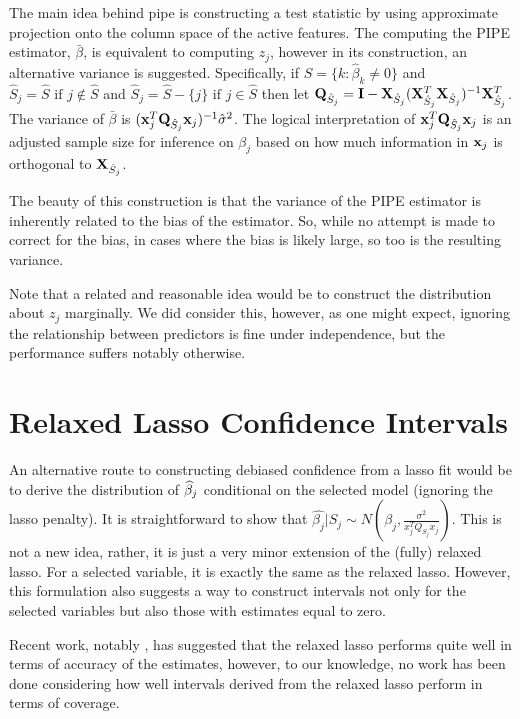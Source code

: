 The main idea behind pipe is constructing a test statistic by using approximate projection onto the column space of the active features. The computing the PIPE estimator, $\bar{\beta}$, is equivalent to computing $z_j$, however in its construction, an alternative variance is suggested. Specifically, if $\hat{S} = \lbrace k: \hat{\beta}_k \neq  0 \rbrace$ and $\hat{S}_j = \hat{S} \text{ if } j \notin \hat{S}$ and $\hat{S}_j = \hat{S} - \lbrace j \rbrace \text{ if } j \in \hat{S}$  then let $\mathbf{Q}_{\hat{S}_j} = \mathbf{I} - \mathbf{X}_{\hat{S}_j}(\mathbf{X}_{\hat{S}_j}^T \mathbf{X}_{\hat{S}_j})^{-1} \mathbf{X}_{\hat{S}_j}^T$. The variance of $\bar{\beta}$ is $(\mathbf{x}_j^T \mathbf{Q}_{\hat{S}_j} \mathbf{x}_j)^{-1}\hat{\sigma}^2$. The logical interpretation of $\mathbf{x}_j^T \mathbf{Q}_{\hat{S}_j} \mathbf{x}_j$ is an adjusted sample size for inference on $\beta_j$ based on how much information in $\mathbf{x}_j$ is orthogonal to $\mathbf{X}_{\hat{S}_j}$. 

The beauty of this construction is that the variance of the PIPE estimator is inherently related to the bias of the estimator. So, while no attempt is made to correct for the bias, in cases where the bias is likely large, so too is the resulting variance.

Note that a related and reasonable idea would be to construct the distribution about $z_j$ marginally. We did consider this, however, as one might expect, ignoring the relationship between predictors is fine under independence, but the performance suffers notably otherwise.

\section{Relaxed Lasso Confidence Intervals}

An alternative route to constructing debiased confidence from a lasso fit would be to derive the distribution of $\widehat{\beta}_j$ conditional on the selected model (ignoring the lasso penalty). It is straightforward to show that $\hat{\beta_j} | S_j \sim N(\beta_j, \frac{\sigma^2}{x_j^T Q_{S_j} x_j})$. This is not a new idea, rather, it is just a very minor extension of the (fully) relaxed lasso. For a selected variable, it is exactly the same as the relaxed lasso. However, this formulation also suggests a way to construct intervals not only for the selected variables but also those with estimates equal to zero. 

Recent work, notably \cite{Hastie2020}, has suggested that the relaxed lasso performs quite well in terms of accuracy of the estimates, however, to our knowledge, no work has been done considering how well intervals derived from the relaxed lasso perform in terms of coverage.

